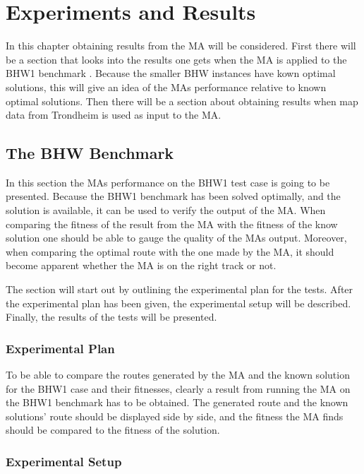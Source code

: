 \chapter{Experiments and Results}
\label{cha:experiments_and_results}

In this chapter obtaining results from the MA will be considered. First there will be a section that looks into the results one gets when the MA is applied to the BHW1 benchmark \citep{BHWdocumentationSINTEF}. Because the smaller BHW instances have kown optimal solutions, this will give an idea of the MAs performance relative to known optimal solutions. Then there will be a section about obtaining results when map data from Trondheim is used as input to the MA.

\section{The BHW Benchmark}
\label{sec:the_bhw_benchmark}

In this section the MAs performance on the BHW1 test case is going to be presented. Because the BHW1 benchmark has been solved optimally, and the solution is available, it can be used to verify the output of the MA. When comparing the fitness of the result from the MA with the fitness of the know solution one should be able to gauge the quality of the MAs output. Moreover, when comparing the optimal route with the one made by the MA, it should become apparent whether the MA is on the right track or not.

The section will start out by outlining the experimental plan for the tests. After the experimental plan has been given, the experimental setup will be described. Finally, the results of the tests will be presented.

\subsection{Experimental Plan}

To be able to compare the routes generated by the MA and the known solution for the BHW1 case and their fitnesses, clearly a result from running the MA on the BHW1 benchmark has to be obtained. The generated route and the known solutions' route should be displayed side by side, and the fitness the MA finds should be compared to the fitness of the solution.

\subsection{Experimental Setup}

